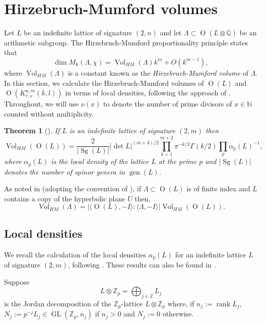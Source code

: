 \documentclass[12pt, a4paper]{article}
\newtheorem{thm}{Theorem}[section]
\newcommand{\ZZ}{\mathbb{Z}}
\newcommand{\QQ}{\mathbb{Q}}
\newcommand{\NN}{\mathbb{N}}
\newcommand{\la}{\langle}
\newcommand{\ra}{\rangle}
\newcommand{\opn}{\operatorname}
\begin{document}
 \section{Hirzebruch-Mumford volumes}\label{HMSec}
Let $L$ be an indefinite lattice of signature $(2,n)$ and let  $\Lambda \subset \opn{O}(L \otimes \QQ)$ be an  arithmetic subgroup.
 The Hirzebruch-Mumford proportionality principle \cite{HMvol} states that   
\[
\opn{dim} M_k(\Lambda, \chi) = \opn{Vol}_{HM}(\Lambda)k^m + O(k^{m-1}),
\]
where $\opn{Vol}_{HM}(\Lambda)$ is a constant known as the \emph{Hirzebruch-Mumford volume} of $\Lambda$.
In this section, we calculate the Hirzebruch-Mumford volumes of $\opn{O}(L)$ and $\opn{O}(K^{u,m}_{r,s}(k,l))$ in terms of local densities, following the approach of \cite{HMvolapps}. 
Throughout, we will use $\nu(x)$ to denote the number of prime divisors of $x \in \NN$ counted without multiplicity.
\begin{thm}[{\cite[Theorem 2.1]{HMvolapps}}]\label{GHSHMvol}
  If $L$ is an indefinite lattice of signature $(2, m)$ then 
  \[
  \opn{Vol}_{HM}(\opn{O}(L)) = \frac{2}{\vert \opn{Sg}(L) \vert} \vert \opn{det} L \vert^{(m+3)/2} \prod_{k=1}^{m+2} \pi^{-k/2} \Gamma(k/2) \prod_p \alpha_p(L)^{-1},
  \] 
  where $\alpha_p(L)$ is the local density of the lattice $L$ at the prime $p$ and $\vert \opn{Sg} (L) \vert$ denotes the number of spinor genera in $\opn{gen}(L)$.
\end{thm}
As noted in \cite{HMvolapps} (adopting the convention of \cite{Ma}), if $\Lambda \subset \opn{O}(L)$ is of finite index and $L$ contains a copy of the hyperbolic plane $U$ then,
\begin{equation}\label{subgpHMvol}
  \opn{Vol}_{HM}(\Lambda) =
  \vert \la \opn{O}(L), -I \ra :\la \Lambda, -I \ra \vert \opn{Vol}_{HM}(\opn{O}(L)).
  \end{equation}
\subsection{Local densities}
  We recall the calculation of the local densities $\alpha_p(L)$ for an indefinite lattice $L$ of signature $(2,m)$, following \cite{HMvolapps}. These results can also be found in \cite{Kitaoka}.


Suppose 
\begin{equation}\label{jordandecomp}
  L \otimes \ZZ_p =\bigoplus_{j \in \ZZ} L_j
\end{equation}
is the Jordan decomposition of the $\ZZ_p$-lattice $L \otimes \ZZ_p$ where, if $n_j:=\opn{rank}L_j$, $N_j:=p^{-j} L_j \in \opn{GL}(\ZZ_p, n_j)$ if $n_j>0$ and $N_j:=0$ otherwise.
\end{document}
